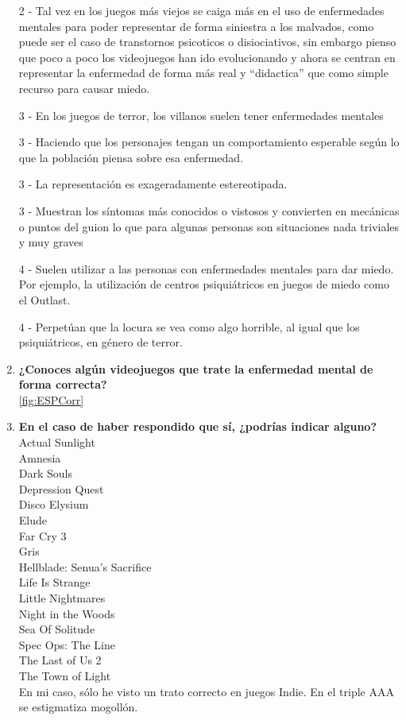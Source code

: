 \documentclass[12pt, a4paper,twoside,titlepage]{book}
\begin{document}
\begin{enumerate}[label=\textbf{\arabic*}.]
    2 - Tal vez en los juegos más viejos se caiga más en el uso de enfermedades mentales para poder representar de forma siniestra a los malvados, como puede ser el caso de transtornos psicoticos o disiociativos, sin embargo pienso que poco a poco los videojuegos han ido evolucionando y ahora se centran en representar la enfermedad de forma más real y ``didactica'' que como simple recurso para causar miedo.
    
    3 - En los juegos de terror, los villanos suelen tener enfermedades mentales
    
    3 - Haciendo que los personajes tengan un comportamiento esperable según lo que la población piensa sobre esa enfermedad.
    
    3 - La representación es exageradamente estereotipada.
    
    3 - Muestran los síntomas más conocidos o vistosos y convierten en mecánicas o puntos del guion lo que para algunas personas son situaciones nada triviales y muy graves
    
    4 - Suelen utilizar a las personas con enfermedades mentales para dar miedo. Por ejemplo, la utilización de centros psiquiátricos en juegos de miedo como el Outlast.
    
    4 - Perpetúan que la locura se vea como algo horrible, al igual que los psiquiátricos, en género de terror.

    
     \item \textbf{¿Conoces algún videojuegos que trate la enfermedad mental de forma correcta? }\\
     \ref{fig:ESPCorr}
     \item \textbf{En el caso de haber respondido que sí, ¿podrías indicar alguno?}\\
    
    Actual Sunlight\\
    Amnesia\\
    Dark Souls\\
    Depression Quest \\
    Disco Elysium\\
    Elude\\
    Far Cry 3\\
    Gris\\
    Hellblade: Senua’s Sacrifice\\
    Life Is Strange\\
    Little Nightmares\\
    Night in the Woods\\
    Sea Of Solitude\\
    Spec Ops: The Line\\
    The Last of Us 2\\
    The Town of Light\\
    En mi caso, sólo he visto un trato correcto en juegos Indie. En el triple AAA se estigmatiza mogollón.


\end{enumerate}
\end{document}
